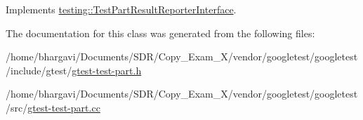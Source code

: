 Implements \hyperlink{classtesting_1_1_test_part_result_reporter_interface_aa2f920e7a5a0a6d0faf19e3727928c22}{testing\+::\+Test\+Part\+Result\+Reporter\+Interface}.



The documentation for this class was generated from the following files\+:\begin{DoxyCompactItemize}
\item 
/home/bhargavi/\+Documents/\+S\+D\+R/\+Copy\+\_\+\+Exam\+\_\+X/vendor/googletest/googletest/include/gtest/\hyperlink{gtest-test-part_8h}{gtest-\/test-\/part.\+h}\item 
/home/bhargavi/\+Documents/\+S\+D\+R/\+Copy\+\_\+\+Exam\+\_\+X/vendor/googletest/googletest/src/\hyperlink{gtest-test-part_8cc}{gtest-\/test-\/part.\+cc}\end{DoxyCompactItemize}
